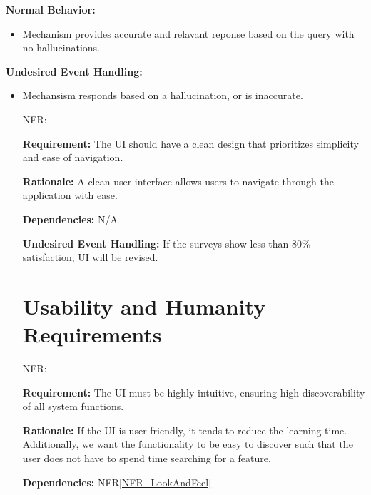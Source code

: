 \documentclass[12pt]{article}
\newcounter{nfrnum} %
\begin{document}
\begin{itemize}
  \textbf{Normal Behavior:}
  \begin{itemize}
    \item Mechanism provides accurate and relavant reponse based on the query with no hallucinations.
  \end{itemize}
  
  \textbf{Undesired Event Handling:}
  \begin{itemize}
    \item Mechansism responds based on a hallucination, or is inaccurate.
  \end{itemize}

\end{itemize}

\noindent \begin{itemize}

\section{Look and Feel Requirements}

\item[NFR\refstepcounter{nfrnum}\thenfrnum \label{NFR_LookAndFeel}:]

\textbf{Requirement:} The UI should have a clean design that prioritizes simplicity and ease of navigation.

\textbf{Rationale:} A clean user interface allows users to navigate through the application with ease.

\textbf{Dependencies:} N/A

\textbf{Undesired Event Handling:} If the surveys show less than 80\% satisfaction, UI will be revised.

\section{Usability and Humanity Requirements}

\item[NFR\refstepcounter{nfrnum}\thenfrnum \label{NFR_Usability}:]

\textbf{Requirement:} The UI must be highly intuitive, ensuring high discoverability of all system functions.

\textbf{Rationale:} If the UI is user-friendly, it tends to reduce the learning time. Additionally, we want the functionality to be easy to discover such that the user does not have to spend time searching for a feature.

\textbf{Dependencies:} NFR\ref{NFR_LookAndFeel}


\end{itemize}
\end{document}
